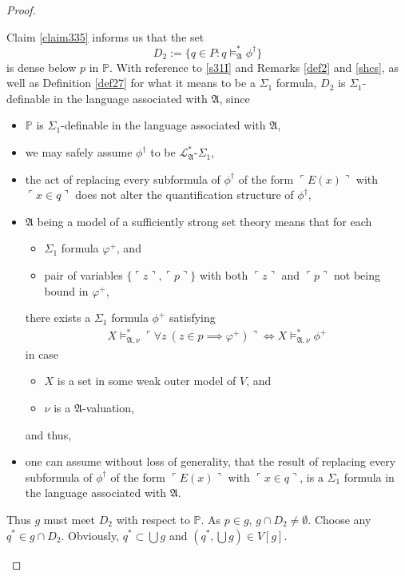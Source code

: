 \documentclass[12pt]{article}
\numberwithin{equation}{section}
\begin{document}
\begin{proof}
\begin{enumerate}[label=Case \arabic*:, leftmargin=50pt]
    Claim \ref{claim335} informs us that the set $$D_2 := \{q \in P : q \models^{*}_{\mathfrak{A}} \phi^{\dagger}\}$$ is dense below $p$ in $\mathbb{P}$. With reference to \ref{s31I} and Remarks \ref{def2} and \ref{shcs}, as well as Definition \ref{def27} for what it means to be a $\Sigma_1$ formula, $D_2$ is $\Sigma_1$-definable in the language associated with $\mathfrak{A}$, since
    \begin{itemize}
        \item $\mathbb{P}$ is $\Sigma_1$-definable in the language associated with $\mathfrak{A}$,
        \item we may safely assume $\phi^{\dagger}$ to be $\mathcal{L}^{*}_{\mathfrak{A}}$-$\Sigma_1$,
        \item the act of replacing every subformula of $\phi^{\dagger}$ of the form $\ulcorner E(x) \urcorner$ with $\ulcorner x \in q \urcorner$ does not alter the quantification structure of $\phi^{\dagger}$,
        \item $\mathfrak{A}$ being a model of a sufficiently strong set theory means that for each 
        \begin{itemize}[label=$\circ$]
            \item $\Sigma_1$ formula $\varphi^+$, and
            \item pair of variables $\{\ulcorner z \urcorner, \ulcorner p \urcorner\}$ with both $\ulcorner z \urcorner$ and $\ulcorner p \urcorner$ not being bound in $\varphi^+$,
        \end{itemize}
        there exists a $\Sigma_1$ formula $\phi^+$ satisfying
        \begin{align*}
            X \models^*_{\mathfrak{A}, \nu} \ulcorner \forall z \ (z \in p \implies \varphi^+) \urcorner \iff X \models^*_{\mathfrak{A}, \nu} \phi^+
        \end{align*}
        in case 
        \begin{itemize}[label=$\circ$]
            \item $X$ is a set in some weak outer model of $V$, and
            \item $\nu$ is a $\mathfrak{A}$-valuation, 
        \end{itemize}
        and thus,
        \item one can assume without loss of generality, that the result of replacing every subformula of $\phi^{\dagger}$ of the form $\ulcorner E(x) \urcorner$ with $\ulcorner x \in q \urcorner$, is a $\Sigma_1$ formula in the language associated with $\mathfrak{A}$.
    \end{itemize}
    Thus $g$ must meet $D_2$ with respect to $\mathbb{P}$. As $p \in g$, $g \cap D_2 \neq \emptyset$. Choose any $q^* \in g \cap D_2$. Obviously, $q^* \subset \bigcup g$ and $(q^*, \bigcup g) \in V[g]$.


\end{enumerate}
\end{proof}
\end{document}
